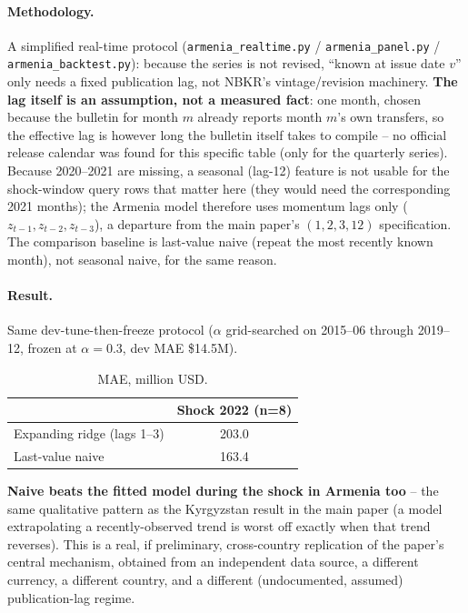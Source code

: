 \documentclass[11pt]{article}
\begin{document}
\paragraph{Methodology.} A simplified real-time protocol
(\texttt{armenia\_realtime.py} / \texttt{armenia\_panel.py} / \texttt{armenia\_backtest.py}):
because
the series is not revised, ``known at issue date $v$'' only needs a fixed publication lag, not
NBKR's vintage/revision machinery. \textbf{The lag itself is an assumption, not a measured
fact}: one month, chosen because the bulletin for month $m$ already reports month $m$'s own
transfers, so the effective lag is however long the bulletin itself takes to compile -- no
official release calendar was found for this specific table (only for the quarterly series). Because 2020--2021 are missing, a seasonal (lag-12) feature is not usable for the shock-window
query rows that matter here (they would need the corresponding 2021 months); the Armenia model
therefore uses momentum lags only ($z_{t-1}, z_{t-2}, z_{t-3}$), a departure from the main
paper's $(1,2,3,12)$ specification. The comparison baseline is last-value naive (repeat the most
recently known month), not seasonal naive, for the same reason.

\paragraph{Result.} Same dev-tune-then-freeze protocol ($\alpha$ grid-searched on 2015--06
through 2019--12, frozen at $\alpha=0.3$, dev MAE \$14.5M).

\begin{table}[h]
\centering
\begin{tabular}{lc}
\toprule
 & Shock 2022 (n=8) \\
\midrule
Expanding ridge (lags 1--3) & 203.0 \\
Last-value naive & 163.4 \\
\bottomrule
\end{tabular}
\caption{MAE, million USD.}
\end{table}

\textbf{Naive beats the fitted model during the shock in Armenia too} -- the same qualitative
pattern as the Kyrgyzstan result in the main paper (a model extrapolating a recently-observed
trend is worst off exactly when that trend reverses). This is a real, if preliminary,
cross-country replication of the paper's central mechanism, obtained from an independent data
source, a different currency, a different country, and a different (undocumented, assumed)
publication-lag regime.
\end{document}

